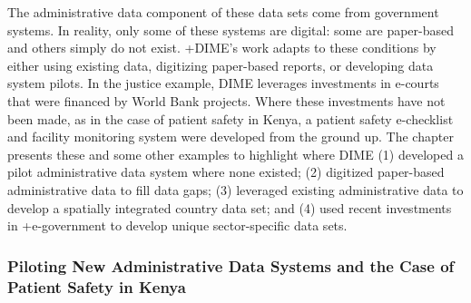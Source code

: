 \documentclass[
]{book}
\begin{document}
The administrative data component of these data sets come from government systems. In reality, only some of these systems are digital: some are paper-based and others simply do not exist. +DIME\textbar's work adapts to these conditions by either using existing data, digitizing paper-based reports, or developing data system pilots. In the justice example, DIME leverages investments in e-courts that were financed by World Bank projects. Where these investments have not been made, as in the case of patient safety in Kenya, a patient safety e-checklist and facility monitoring system were developed from the ground up. The chapter presents these and some other examples to highlight where DIME (1) developed a pilot administrative data system where none existed; (2) digitized paper-based administrative data to fill data gaps; (3) leveraged existing administrative data to develop a spatially integrated country data set; and (4) used recent investments in +e-government\textbar{} to develop unique sector-specific data sets.

\hypertarget{piloting-new-administrative-data-systems-and-the-case-of-patient-safety-in-kenya}{%
\subsubsection{Piloting New Administrative Data Systems and the Case of Patient Safety in Kenya}\label{piloting-new-administrative-data-systems-and-the-case-of-patient-safety-in-kenya}}
\end{document}
